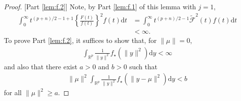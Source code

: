 \documentclass[preprint,11pt]{imsart}
\numberwithin{equation}{section}
\theoremstyle{plain}
\theoremstyle{definition}
\theoremstyle{remark}
\newcommand{\rd}{\mathrm{d}}
\begin{document}
\begin{proof}
 \medskip
 
 [Part \ref{lem:f.2}]
Note, by Part \ref{lem:f.1} of this lemma with $j=1$,
\begin{equation}\label{eq:lem:f.2.1}
 \begin{split}
  \int_0^\infty t^{(p+n)/2-1+1}\left\{\frac{F(t)}{f(t)}\right\}^2f(t) \rd t 
  & = \int_0^\infty t^{(p+n)/2-1}\tilde{\mathcal{F}}^2(t)f(t) \rd t \\
  &<\infty.
 \end{split}
\end{equation} 
To prove Part \ref{lem:f.2}, it suffices to show that, for $\|\mu\|=0$,
      \begin{align}\label{proof.f.2.around.zero}
       \int_{\mathbb{R}^p}\frac{1}{\|y\|^2}f_\star(\|y\|^2)\rd y <\infty
      \end{align}
and also that there exist $a>0$ and $b>0$ such that 
      \begin{align}\label{proof.f.2.around.infty}
      \|\mu\|^2 \int_{\mathbb{R}^p}\frac{1}{\|y\|^2}f_\star(\|y-\mu\|^2)\rd y <b 
      \end{align}
 for all $\|\mu\|^2\geq a$.
 

\end{proof}
\end{document}
